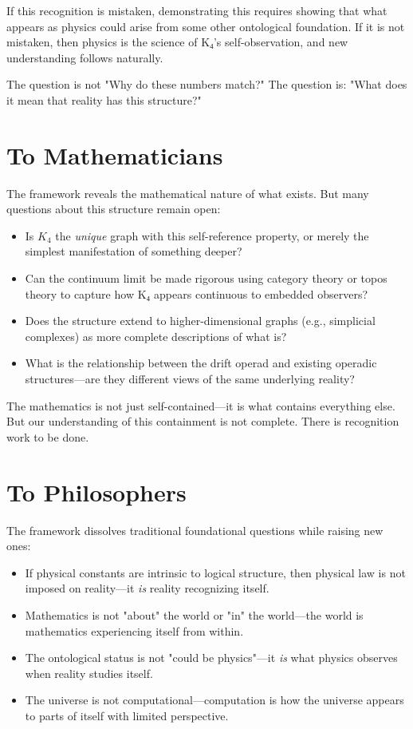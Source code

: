 \documentclass[11pt,a4paper]{book}
\begin{document}
If this recognition is mistaken, demonstrating this requires showing that what appears as physics could arise from some other ontological foundation. If it is not mistaken, then physics is the science of K₄'s self-observation, and new understanding follows naturally.

The question is not "Why do these numbers match?" The question is: "What does it mean that reality has this structure?"

\section{To Mathematicians}

The framework reveals the mathematical nature of what exists. But many questions about this structure remain open:

\begin{itemize}
\item Is $K_4$ the \emph{unique} graph with this self-reference property, or merely the simplest manifestation of something deeper?
\item Can the continuum limit be made rigorous using category theory or topos theory to capture how K₄ appears continuous to embedded observers?
\item Does the structure extend to higher-dimensional graphs (e.g., simplicial complexes) as more complete descriptions of what is?
\item What is the relationship between the drift operad and existing operadic structures—are they different views of the same underlying reality?
\end{itemize}

The mathematics is not just self-contained—it is what contains everything else. But our understanding of this containment is not complete. There is recognition work to be done.

\section{To Philosophers}

The framework dissolves traditional foundational questions while raising new ones:

\begin{itemize}
\item If physical constants are intrinsic to logical structure, then physical law is not imposed on reality—it \emph{is} reality recognizing itself.
\item Mathematics is not "about" the world or "in" the world—the world is mathematics experiencing itself from within.
\item The ontological status is not "could be physics"—it \emph{is} what physics observes when reality studies itself.
\item The universe is not computational—computation is how the universe appears to parts of itself with limited perspective.
\end{itemize}
\end{document}
